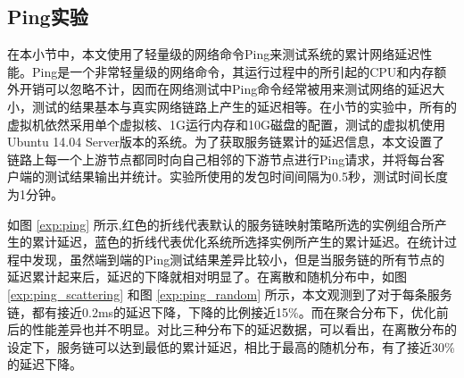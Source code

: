 \subsection{Ping实验}
在本小节中，本文使用了轻量级的网络命令Ping来测试系统的累计网络延迟性能。Ping是一个非常轻量级的网络命令，其运行过程中的所引起的CPU和内存额外开销可以忽略不计，因而在网络测试中Ping命令经常被用来测试网络的延迟大小，测试的结果基本与真实网络链路上产生的延迟相等。在小节的实验中，所有的虚拟机依然采用单个虚拟核、1G运行内存和10G磁盘的配置，测试的虚拟机使用Ubuntu 14.04 Server版本的系统。为了获取服务链累计的延迟信息，本文设置了链路上每一个上游节点都同时向自己相邻的下游节点进行Ping请求，并将每台客户端的测试结果输出并统计。实验所使用的发包时间间隔为0.5秒，测试时间长度为1分钟。
\begin{figure}[!htp]
	\centering
	
\end{figure}
\begin{figure}
	\addtocounter{subfigure}{2}
	\ContinuedFloat
	\centering

\end{figure}

如图 \ref{exp:ping} 所示,红色的折线代表默认的服务链映射策略所选的实例组合所产生的累计延迟，蓝色的折线代表优化系统所选择实例所产生的累计延迟。在统计过程中发现，虽然端到端的Ping测试结果差异比较小，但是当服务链的所有节点的延迟累计起来后，延迟的下降就相对明显了。在离散和随机分布中，如图 \ref{exp:ping_scattering} 和图 \ref{exp:ping_random} 所示，本文观测到了对于每条服务链，都有接近0.2ms的延迟下降，下降的比例接近15\%。而在聚合分布下，优化前后的性能差异也并不明显。对比三种分布下的延迟数据，可以看出，在离散分布的设定下，服务链可以达到最低的累计延迟，相比于最高的随机分布，有了接近30\%的延迟下降。


